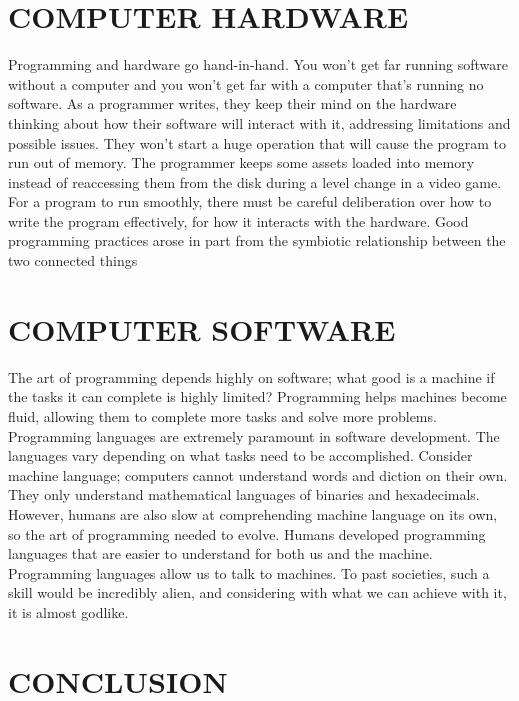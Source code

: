 \documentclass[letterpaper, 10 pt, conference]{IEEEconf}
\begin{document}
\section{COMPUTER HARDWARE}


Programming and hardware go hand-in-hand. You won’t get far running software without a computer
and you won’t get far with a computer that’s running no software. 
As a programmer writes, they keep their mind on the hardware thinking about how their software
will interact with it, addressing limitations and possible issues. They won’t start a huge
operation that will cause the program to run out of memory. The programmer keeps some assets
loaded into memory instead of reaccessing them from the disk during a level change in a video
game. For a program to run smoothly, there must be careful deliberation over how to write the
program effectively, for how it interacts with  the hardware. 
Good programming practices arose in part from the symbiotic relationship between the two
connected things

\section{COMPUTER SOFTWARE}

The art of programming depends highly on software; what good is a machine if the tasks it can complete is highly limited? 
Programming helps machines become fluid, allowing them to complete more tasks and solve more problems. 
Programming languages are extremely paramount in software development. 
The languages vary depending on what tasks need to be accomplished. 
Consider machine language; computers cannot understand words and diction on their own. 
They only understand mathematical languages of binaries and hexadecimals. 
However, humans are also slow at comprehending machine language on its own, so the art of programming needed to evolve. 
Humans developed programming languages that are easier to understand for both us and the machine. 
Programming languages allow us to talk to machines.
 To past societies, such a skill would be incredibly alien, and considering with what we can achieve with it, it is almost godlike. 

\section{CONCLUSION}
\end{document}
